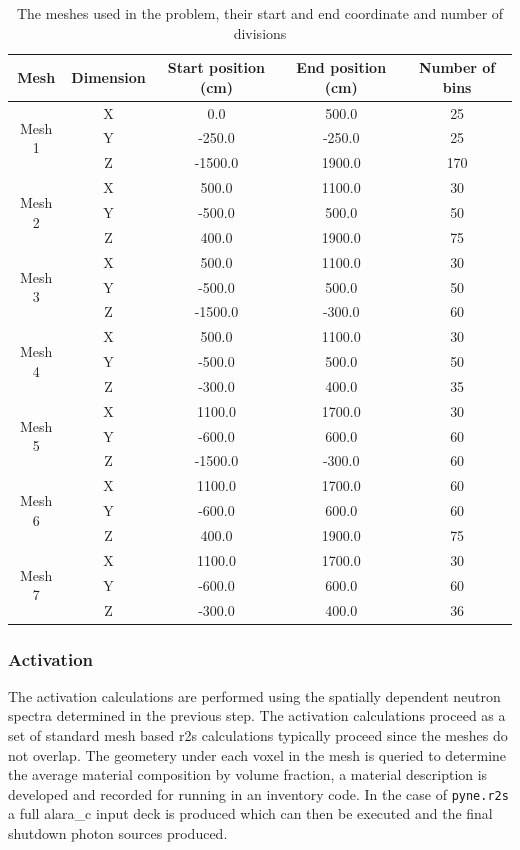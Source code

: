 \documentclass[12pt]{article}
\begin{document}
\begin{centering}
 \begin{table}[ht!]
  \begin{tabular}{c | c | c | c | c}
  \hline 
  Mesh & Dimension & Start position (cm) & End position (cm) & Number of bins\\
  \hline 
  \multirow{3}{*}{Mesh 1} & X & 0.0 & 500.0 & 25 \\ & Y & -250.0 & -250.0 & 25 \\
  & Z & -1500.0 & 1900.0 & 170 \\
  \hline
  \multirow{3}{*}{Mesh 2} & X & 500.0 & 1100.0 & 30 \\ & Y & -500.0 & 500.0 & 50\\
  & Z & 400.0 & 1900.0 & 75 \\
  \hline
  \multirow{3}{*}{Mesh 3} & X & 500.0 & 1100.0 & 30 \\ & Y & -500.0 & 500.0 & 50 \\
  & Z & -1500.0 & -300.0 & 60 \\
  \hline
  \multirow{3}{*}{Mesh 4} & X & 500.0 & 1100.0 & 30 \\ & Y & -500.0 & 500.0 & 50 \\
  & Z & -300.0 & 400.0 & 35 \\
  \hline
  \multirow{3}{*}{Mesh 5} & X & 1100.0 & 1700.0 & 30 \\ & Y & -600.0 & 600.0 & 60 \\
  & Z & -1500.0 & -300.0 & 60 \\
  \hline
  \multirow{3}{*}{Mesh 6} & X & 1100.0 & 1700.0 & 60 \\ & Y & -600.0 & 600.0 & 60 \\
  & Z & 400.0 & 1900.0 & 75\\
  \hline
  \multirow{3}{*}{Mesh 7} & X & 1100.0 & 1700.0 & 30 \\ & Y & -600.0 & 600.0 & 60 \\
  & Z & -300.0 & 400.0 & 36 
  \end{tabular}
 \caption{The meshes used in the problem, their start and end coordinate and
          number of divisions}
 \label{table:mesh_sizes}
 \end{table}
\end{centering}
\subsubsection{Activation}
The activation calculations are performed using the spatially dependent neutron
spectra determined in the previous step. The activation calculations proceed as
a set of standard mesh based \gls{r2s} calculations typically proceed since the meshes
do not overlap. The geometery under each voxel in the mesh is queried to determine
the average material composition by volume fraction, a material description is developed
and recorded for running in an inventory code. In the case of \texttt{pyne.r2s} a full
\gls{alara_c} input deck is produced which can then be executed and the final shutdown
photon sources produced.
\end{document}
